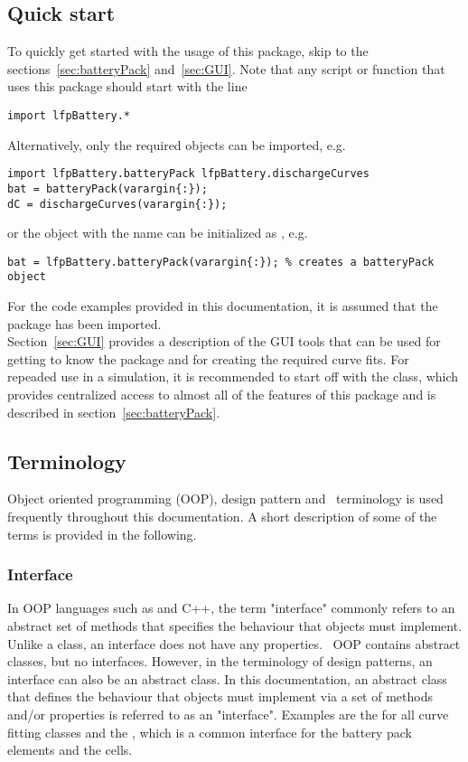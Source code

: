 \subsection*{Quick start}
To quickly get started with the usage of this package, skip to the sections~\ref{sec:batteryPack} and~\ref{sec:GUI}. Note that any script or function that uses this package should start with the line
\begin{lstlisting}
import lfpBattery.*
\end{lstlisting}
Alternatively, only the required objects can be imported, e.g.
\begin{lstlisting}
import lfpBattery.batteryPack lfpBattery.dischargeCurves
bat = batteryPack(varargin{:});
dC = dischargeCurves(varargin{:});
\end{lstlisting}
or the object with the name  can be initialized as , e.g.
\begin{lstlisting}
bat = lfpBattery.batteryPack(varargin{:}); % creates a batteryPack object
\end{lstlisting}
For the code examples provided in this documentation, it is assumed that the  package has been imported. \\
Section~\ref{sec:GUI} provides a description of the GUI tools that can be used for getting to know the package and for creating the required curve fits. For repeaded use in a simulation, it is recommended to start off with the  class, which provides centralized access to almost all of the features of this package and is described in section~\ref{sec:batteryPack}.

\subsection*{Terminology}
Object oriented programming (OOP), design pattern and \matlab\ terminology is used frequently throughout this documentation. A short description of some of the terms is provided in the following.

\subsubsection*{Interface} \label{sec:interface}
In OOP languages such as \java and C++, the term "interface" commonly refers to an abstract set of methods that specifies the behaviour that objects must implement. Unlike a class, an interface does not have any properties. \matlab\ OOP contains abstract classes, but no interfaces. However, in the terminology of design patterns, an interface can also be an abstract class. In this documentation, an abstract class that defines the behaviour that objects must implement via a set of methods and/or properties is referred to as an "interface". Examples are the  for all curve fitting classes and the , which is a common interface for the battery pack elements and the cells.

